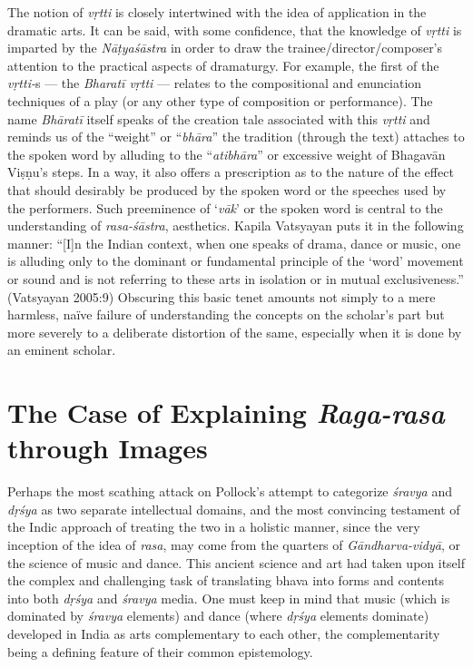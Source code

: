 The notion of \textsl{vṛtti} is closely intertwined with the idea of application in the dramatic arts. It can be said, with some confidence, that the knowledge of \textsl{vṛtti} is imparted by the \textsl{Nāṭyaśāstra} in order to draw the trainee/director/composer’s attention to the practical aspects of dramaturgy. For example, the first of the \textsl{vṛtti-}s --- the \textsl{Bharatī vṛtti} --- relates to the compositional and enunciation techniques of a play (or any other type of composition or performance). The name \textsl{Bhāratī} itself speaks of the creation tale associated with this \textsl{vṛtti} and reminds us of the “weight” or “\textsl{bhāra}” the tradition (through the text) attaches to the spoken word by alluding to the “\textsl{atibhāra}” or excessive weight of Bhagavān Viṣṇu’s steps. In a way, it also offers a prescription as to the nature of the effect that should desirably be produced by the spoken word or the speeches used by the performers. Such preeminence of ‘\textsl{vāk}’ or the spoken word is central to the understanding of \textsl{rasa-śāstra}, aesthetics. Kapila Vatsyayan puts it in the following manner: “[I]n the Indian context, when one speaks of drama, dance or music, one is alluding only to the dominant or fundamental principle of the ‘word’ movement or sound and is not referring to these arts in isolation or in mutual exclusiveness.” (Vatsyayan 2005:9) Obscuring this basic tenet amounts not simply to a mere harmless, naïve failure of understanding the concepts on the scholar’s part but more severely to a deliberate distortion of the same, especially when it is done by an eminent scholar.\\[-21pt]       

\section*{The Case of Explaining \textsl{Raga-rasa} through Images}

Perhaps the most scathing attack on Pollock’s attempt to categorize \textsl{śravya} and \textsl{dṛśya} as two separate intellectual domains, and the most convincing testament of the Indic approach of treating the two in a holistic manner, since the very inception of the idea of \textsl{rasa}, may come from the quarters of \textsl{Gāndharva-vidyā}, or the science of music and dance. This ancient science and art had taken upon itself the complex and challenging task of translating bhava into forms and contents into both \textsl{dṛśya} and \textsl{śravya} media. One must keep in mind that music (which is dominated by \textsl{śravya} elements) and dance (where \textsl{dṛśya} elements dominate) developed in India as arts complementary to each other, the complementarity being a defining feature of their common epistemology. 

